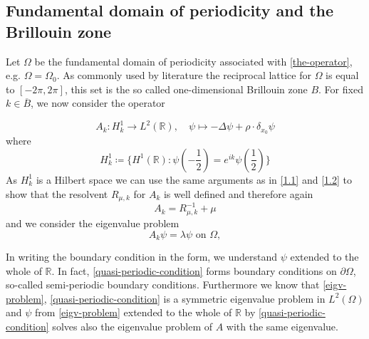 \documentclass[fontsize=14pt,a4paper,DIV=1]{scrartcl}
\numberwithin{equation}{section}
\newcommand{\R}{\mathbb{R}}
\begin{document}
\subsection{Fundamental domain of periodicity and the Brillouin zone}
  Let $\Omega$ be the fundamental domain of periodicity associated with \eqref{the-operator}, e.g. $\Omega = \Omega_{0}$. As commonly used by literature the reciprocal lattice for $\Omega$ is equal to $[-2\pi, 2\pi]$, this set is the so called one-dimensional Brillouin zone $B$. For fixed $k \in \overline{B}$, we now consider the operator 
	
	\begin{equation}
		A_{k} \colon H^{1}_{k} \rightarrow L^{2}(\R), \quad \psi \mapsto - \Delta \psi + \rho \cdot \delta_{x_{0}} \psi
	\end{equation}
	where 
		\begin{equation}
			H^{1}_{k} \coloneqq \big\{ H^{1}(\R) : \psi (-\frac{1}{2}) = e^{ik} \psi(\frac{1}{2}) \big\} \label{quasi-periodic-condition}	
		\end{equation}
 As $H^{1}_{k}$ is a Hilbert space we can use the same arguments as in \ref{1.1} and \ref{1.2} to show that the resolvent $R_{\mu, k}$ for $A_{k}$ is well defined and therefore again
	\[ A_{k} = R_{\mu, k}^{-1} + \mu \]
	and we consider the eigenvalue problem
	\begin{equation}
		A_{k} \psi = \lambda \psi \text{ on } \Omega, \label{eigv-problem}
	\end{equation}

	In writing the boundary condition in the form, we understand $\psi$ extended to the whole of $\R$. In fact, \eqref{quasi-periodic-condition} forms boundary conditions on $\partial \Omega$, so-called semi-periodic boundary conditions. Furthermore we know that \eqref{eigv-problem}, \eqref{quasi-periodic-condition} is a symmetric eigenvalue problem in $L^{2}(\Omega)$ and $\psi$ from \ref{eigv-problem} extended to the whole of $\R$ by \eqref{quasi-periodic-condition} solves also the eigenvalue problem of $A$ with the same eigenvalue. \\
	
\end{document}
